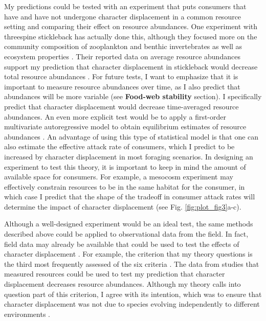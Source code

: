 \documentclass[11pt,]{article}
\begin{document}
My predictions could be tested with an experiment that puts consumers
that have and have not undergone character displacement in a common
resource setting and comparing their effect on resource abundances. One
experiment with threespine stickleback has actually done this, although
they focused more on the community composition of zooplankton and
benthic invertebrates as well as ecosystem properties
\citep{Harmon2009}. Their reported data on average resource abundances
support my prediction that character displacement in stickleback would
decrease total resource abundances \citep[compare totals for ``BL'' vs.
``G'' in Table 1 of][]{Harmon2009}. For future tests, I want to
emphasize that it is important to measure resource abundances over time,
as I also predict that abundances will be more variable (see
\textbf{Food-web stability} section). I specifically predict that
character displacement would decrease time-averaged resource abundances.
An even more explicit test would be to apply a first-order multivariate
autoregressive model to obtain equilibrium estimates of resource
abundances \citep[see equation 15 in][]{Ives2003}. An advantage of using
this type of statistical model is that one can also estimate the
effective attack rate of consumers, which I predict to be increased by
character displacement in most foraging scenarios. In designing an
experiment to test this theory, it is important to keep in mind the
amount of available space for consumers. For example, a mesocosm
experiment may effectively constrain resources to be in the same habitat
for the consumer, in which case I predict that the shape of the tradeoff
in consumer attack rates will determine the impact of character
displacement (see Fig. \ref{fig:plot_fig3}a-c).

Although a well-designed experiment would be an ideal test, the same
methods described above could be applied to observational data from the
field. In fact, field data may already be available that could be used
to test the effects of character displacement \citep{Schluter2000}. For
example, the criterion that my theory questions is the third most
frequently assessed of the six criteria \citep[see ``Environmental
controls'' in Figure 1 of][]{Schluter2000}. The data from studies that
measured resources could be used to test my prediction that character
displacement decreases resource abundances. Although my theory calls
into question part of this criterion, I agree with its intention, which
was to ensure that character displacement was not due to species
evolving independently to different environments \citep{Schluter1992}.
\end{document}
